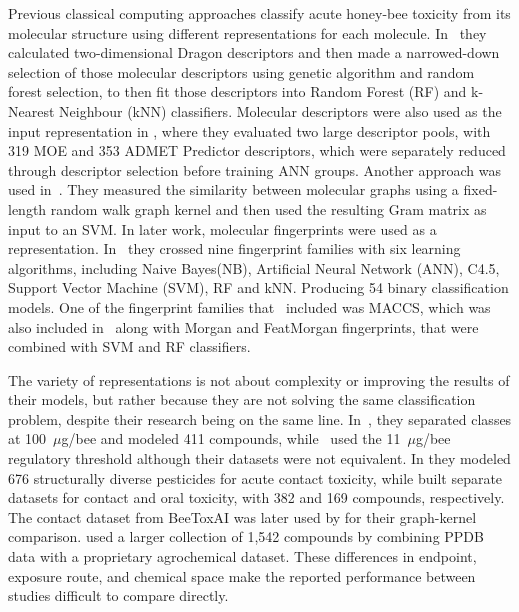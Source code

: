 \documentclass[conference]{IEEEtran}
\begin{document}
Previous classical computing approaches classify acute honey-bee toxicity from its molecular structure using different representations for each molecule. In~\cite{carnesecchi2020integrating} they calculated two-dimensional Dragon descriptors and then made a narrowed-down selection of those molecular descriptors using genetic algorithm and random forest selection, to then fit those descriptors into Random Forest (RF) and k-Nearest Neighbour (kNN) classifiers. Molecular descriptors were also used as the input representation in \cite{sharifi2024insilico}, where they evaluated two large descriptor pools, with 319 MOE and 353 ADMET Predictor descriptors, which were separately reduced through descriptor selection before training ANN groups.
Another approach was used in~\cite{yang2022randomwalk}. They measured the similarity between molecular graphs using a fixed-length random walk graph kernel and then used the resulting Gram matrix as input to an SVM.
In later work, molecular fingerprints were used as a representation. In~\cite{xu2021insilico} they crossed nine fingerprint families with six learning algorithms, including Naive Bayes(NB), Artificial Neural Network (ANN), C4.5, Support Vector Machine (SVM), RF and kNN. Producing 54 binary classification models. One of the fingerprint families that~\cite{xu2021insilico} included was MACCS, which was also included in~\cite{moreirafilho2021beetoxai} along with Morgan and FeatMorgan fingerprints, that were combined with SVM and RF classifiers.

The variety of representations is not about complexity or improving the results of their models, but rather because they are not solving the same classification problem, despite their research being on the same line. In~\cite{carnesecchi2020integrating}, they separated classes at 100~$\mu$g/bee and modeled 411 compounds, while~\cite{xu2021insilico, moreirafilho2021beetoxai, sharifi2024insilico} used the 11~$\mu$g/bee regulatory threshold although their datasets were not equivalent. In \cite{xu2021insilico} they modeled 676 structurally diverse pesticides for acute contact toxicity, while \cite{moreirafilho2021beetoxai} built separate datasets for contact and oral toxicity, with 382 and 169 compounds, respectively. The contact dataset from BeeToxAI was later used by \cite{yang2022randomwalk} for their graph-kernel comparison. \cite{sharifi2024insilico} used a larger collection of 1,542 compounds by combining PPDB data with a proprietary agrochemical dataset. These differences in endpoint, exposure route, and chemical space make the reported performance between studies difficult to compare directly.
\end{document}

